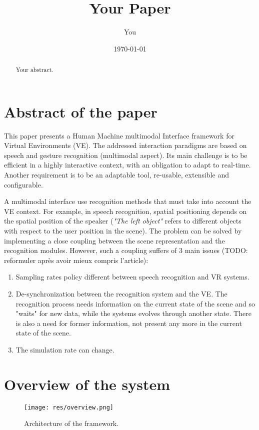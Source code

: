 \documentclass[a4paper]{article}
\title{Your Paper}
\author{You}
\date{\today}
\begin{document}
\maketitle

\begin{abstract}
Your abstract.
\end{abstract}

\section{Abstract of the paper}

This paper presents a Human Machine multimodal Interface framework for Virtual Environments (VE). The addressed interaction paradigms are based on speech and gesture recognition (multimodal aspect). Its main challenge is to be efficient in a highly interactive context, with an obligation to adapt to real-time. Another requirement is to be an adaptable tool, re-usable, extensible and configurable.

A multimodal interface use recognition methods that must take into account the VE context. For example, in speech recognition, spatial positioning depends on the spatial position of the speaker (\textit{"The left object"} refers to different objects with respect to the user position in the scene). The problem can be solved by implementing a close coupling between the scene representation and the recognition modules. However, such a coupling suffers of 3 main issues (TODO: reformuler après avoir mieux compris l'article):
\begin{enumerate}
	\item Sampling rates policy different between speech recognition and VR systems.
	\item De-synchronization between the recognition system and the VE. The recognition process needs information on the current state of the scene and so "waits" for new data, while the systems evolves through another state. There is also a need for former information, not present any more in the current state of the scene.
	\item The simulation rate can change.
\end{enumerate}

\section{Overview of the system}
\label{sec:overview}
\begin{figure}
\centering
\texttt{[image: res/overview.png]}
\caption{\label{fig:overview}Architecture of the framework.}
\end{figure}
\end{document}
